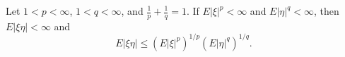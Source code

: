 Let $1 < p < \infty$, $1 < q < \infty$, and $\frac{1}{p} + \frac{1}{q} = 1$. If $E|\xi|^p < \infty$ and $E|\eta|^q < \infty$, then $E|\xi\eta| < \infty$ and
$$E|\xi\eta| \leq (E|\xi|^p)^{1/p} (E|\eta|^q)^{1/q}.$$
